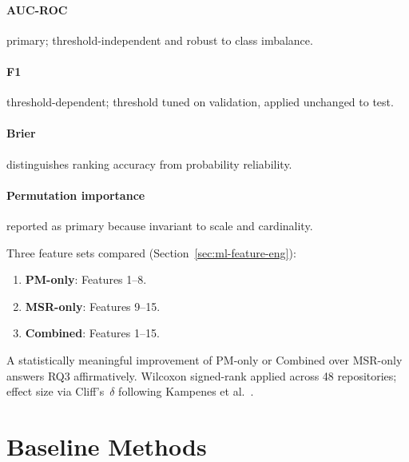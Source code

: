 \paragraph{AUC-ROC} primary; threshold-independent and robust to class
imbalance. \paragraph{F1} threshold-dependent; threshold tuned on
validation, applied unchanged to test. \paragraph{Brier} distinguishes
ranking accuracy from probability reliability.
\paragraph{Permutation importance} reported as primary because invariant
to scale and cardinality.

Three feature sets compared (Section~\ref{sec:ml-feature-eng}):
\begin{enumerate}
  \item \textbf{PM-only}: Features 1--8.
  \item \textbf{MSR-only}: Features 9--15.
  \item \textbf{Combined}: Features 1--15.
\end{enumerate}

A statistically meaningful improvement of PM-only or Combined over
MSR-only answers RQ3 affirmatively. Wilcoxon signed-rank applied across
48 repositories; effect size via Cliff's~$\delta$ following
Kampenes et al.~\cite{kampenes2007systematic}.


\section{Baseline Methods}
\label{sec:baselines}


